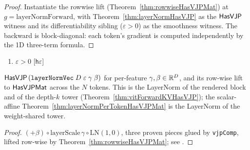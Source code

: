 \begin{theorem}
  \label{thm:layerNormPerTokenHasVJPMat}
  \leanok
\end{theorem}

\begin{proof}
\leanok
Instantiate the rowwise lift (Theorem~\ref{thm:rowwiseHasVJPMat})
at \(g = \mathrm{layerNormForward}\), with
Theorem~\ref{thm:layerNormHasVJP} as the \(\mathsf{HasVJP}\) witness and
its differentiability sibling (\(\varepsilon > 0\)) as the smoothness
witness. The backward is block-diagonal: each token's gradient is
computed independently by the 1D three-term formula. \Qed{}
\end{proof}

\begin{theorem}
  \label{thm:layerNormVecHasVJP}
  \leanok
  \Assume{}
  \begin{enumerate}
    \item \(\varepsilon > 0\) \hfill[\texttt{h\(\varepsilon\)}]
  \end{enumerate}
  \Prove{}
  \(\mathsf{HasVJP}\,(\texttt{layerNormVec}\; D\; \varepsilon\; \gamma\; \beta)\) for
  per-feature \(\gamma, \beta \in \mathbb{R}^{D}\), and its row-wise lift to
  \(\mathsf{HasVJPMat}\) across the \(N\) tokens. This is the LayerNorm of the
  rendered block and of the depth-\(k\) tower
  (Theorem~\ref{thm:vitForwardKVHasVJP}); the scalar-affine
  Theorem~\ref{thm:layerNormPerTokenHasVJPMat} is the LayerNorm of the
  weight-shared tower.
\end{theorem}

\begin{proof}
\leanok
\((+\beta) \circ \mathrm{layerScale}\,\gamma \circ \mathrm{LN}(1, 0)\), three
proven pieces glued by \texttt{vjpComp}, lifted row-wise by
Theorem~\ref{thm:rowwiseHasVJPMat}; see
.
\end{proof}

